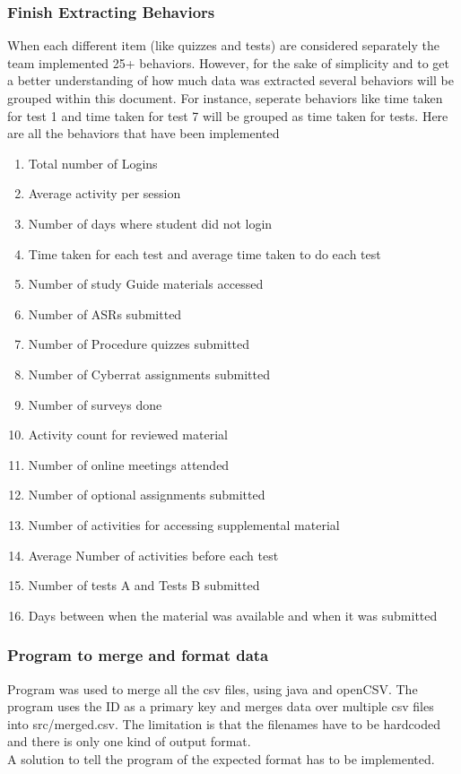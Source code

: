 \documentclass[12pt]{article}
\begin{document}
	\subsubsection{Finish Extracting Behaviors}
	When each different item (like quizzes and tests) are considered separately the team implemented 25+ behaviors. However, for the sake of simplicity and to get a better understanding of how much data was extracted several behaviors will be grouped within this document. For instance, seperate behaviors like time taken for test 1 and time taken for test 7 will be grouped as time taken for tests. 
	Here are all the behaviors that have been implemented
	\begin{enumerate}
		\item Total number of Logins
		\item Average activity per session
		\item Number of days where student did not login
		\item Time taken for each test and average time taken to do each test
		\item Number of study Guide materials accessed
		\item Number of ASRs submitted
		\item Number of Procedure quizzes submitted
		\item Number of Cyberrat assignments submitted
		\item Number of surveys done
		\item Activity count for reviewed material
		\item Number of online meetings attended
		\item Number of optional assignments submitted
		\item Number of activities for accessing supplemental material
		\item Average Number of activities before each test
		\item Number of tests A and Tests B submitted
		\item Days between when the material was available and when it was submitted
	\end{enumerate}
	
	\subsubsection{Program to merge and format data}
	Program was used to merge all the csv files, using java and openCSV. The program uses the ID as a primary key and merges data over multiple csv files into src/merged.csv. The limitation is that the filenames have to be hardcoded and there is only one kind of output format. \\
	A solution to tell the program of the expected format has to be implemented. 
	
\end{document}
